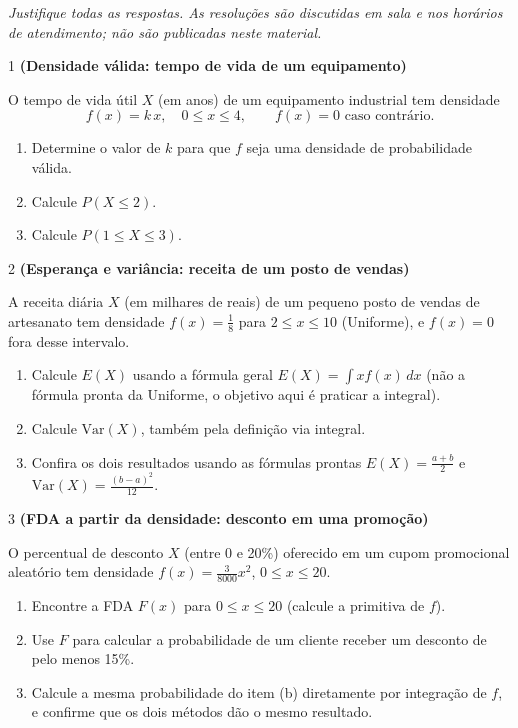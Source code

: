 \documentclass[11pt]{article}
\begin{document}

\noindent \textit{Justifique todas as respostas. As resoluções são discutidas em sala e nos horários de atendimento; não são publicadas neste material.}

\begin{questao}{1} \textbf{(Densidade válida: tempo de vida de um equipamento)}

O tempo de vida útil $X$ (em anos) de um equipamento industrial tem densidade
$$
f(x) = k\,x, \quad 0\le x\le 4, \qquad f(x)=0 \text{ caso contrário.}
$$

\begin{enumerate}[label=(\alph*)]
  \item Determine o valor de $k$ para que $f$ seja uma densidade de probabilidade válida.
  \item Calcule $P(X\le 2)$.
  \item Calcule $P(1\le X\le 3)$.
\end{enumerate}
\end{questao}

\begin{questao}{2} \textbf{(Esperança e variância: receita de um posto de vendas)}

A receita diária $X$ (em milhares de reais) de um pequeno posto de vendas de artesanato tem
densidade $f(x) = \frac{1}{8}$ para $2\le x\le 10$ (Uniforme), e $f(x)=0$ fora desse intervalo.

\begin{enumerate}[label=(\alph*)]
  \item Calcule $E(X)$ usando a fórmula geral $E(X)=\int x f(x)\,dx$ (não a fórmula pronta da
    Uniforme, o objetivo aqui é praticar a integral).
  \item Calcule $\mathrm{Var}(X)$, também pela definição via integral.
  \item Confira os dois resultados usando as fórmulas prontas $E(X)=\frac{a+b}{2}$ e
    $\mathrm{Var}(X)=\frac{(b-a)^2}{12}$.
\end{enumerate}
\end{questao}

\begin{questao}{3} \textbf{(FDA a partir da densidade: desconto em uma promoção)}

O percentual de desconto $X$ (entre 0 e 20\%) oferecido em um cupom promocional aleatório tem
densidade $f(x) = \frac{3}{8000}x^2$, $0\le x\le 20$.

\begin{enumerate}[label=(\alph*)]
  \item Encontre a FDA $F(x)$ para $0\le x\le 20$ (calcule a primitiva de $f$).
  \item Use $F$ para calcular a probabilidade de um cliente receber um desconto de pelo menos 15\%.
  \item Calcule a mesma probabilidade do item (b) diretamente por integração de $f$, e confirme
    que os dois métodos dão o mesmo resultado.
\end{enumerate}
\end{questao}
\end{document}
